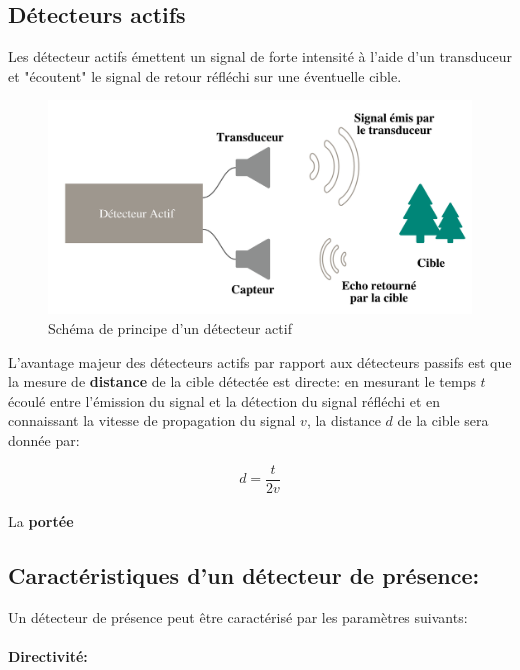\documentclass[12pt,a4paper]{report}
\begin{document}
\subsection{Détecteurs actifs}

Les détecteur actifs émettent un signal de forte intensité à l'aide d'un transduceur et "écoutent" le signal de retour réfléchi sur une éventuelle cible. 

\begin{figure}[H]
	\centering
	\includegraphics[width=0.8\linewidth]{img/detecteuractif}
	\caption{Schéma de principe d'un détecteur actif}
	\label{fig:detecteuractif}
\end{figure}

L'avantage majeur des détecteurs actifs par rapport aux détecteurs passifs est que la mesure de \textbf{distance} de la cible détectée est directe: en mesurant le temps $t$ écoulé entre l'émission du signal et la détection du signal réfléchi et en connaissant la vitesse de propagation du signal $v$, la distance $d$ de la cible sera donnée par:

\begin{equation}
	d = \frac{t}{2v}
\end{equation}

\paragraph{} La \textbf{portée}

\subsection{Caractéristiques d'un détecteur de présence:} Un détecteur de présence peut être caractérisé par les paramètres suivants:

\paragraph{Directivité:} 
 
\end{document}
